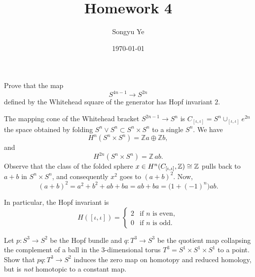 \documentclass[12pt]{article}
\title{Homework 4}
\author{Songyu Ye}
\date{\today}
\begin{document}
\psettitle

\begin{problem}[1]
Prove that the map
\[
S^{4n-1}\to S^{2n}
\]
defined by the Whitehead square of the generator has Hopf invariant \(2\).
\end{problem}

\begin{solution}
    The mapping cone of the Whitehead bracket $S^{2n-1} \to S^n$ is $C_{[\iota,\iota]}=S^n\cup_{[\iota,\iota]} e^{2n}$ the space obtained by folding $S^n \vee S^n \subset S^n \times S^n$ to a single $S^n$. We have
\[
H^n(S^n\times S^n) = \mathbb{Z}a \oplus \mathbb{Z}b,
\]
and
\[
H^{2n}(S^n\times S^n) = \mathbb{Z}\,ab.
\]
Observe that the class of the folded sphere \(x \in H^n(C_{[\iota,\iota]},\mathbb{Z}) \cong \mathbb{Z}\) pulls back to \(a+b\) in \(S^n\times S^n\),
and consequently \(x^2\) goes to \((a+b)^2\). Now,
\[
(a+b)^2 = a^2 + b^2 + ab + ba = ab + ba = \bigl(1 + (-1)^n\bigr)ab.
\]

In particular, the Hopf invariant is
\[
H([\iota,\iota]) =
\begin{cases}
2 & \text{if \(n\) is even},\\
0 & \text{if \(n\) is odd}.
\end{cases}
\]
\end{solution}

\begin{problem}[2 (Hatcher AT, 4.2.34)]
Let \(p:S^3\to S^2\) be the Hopf bundle and \(q:T^3\to S^3\) be the quotient map collapsing the complement of a ball in the \(3\)-dimensional torus \(T^3=S^1\times S^1\times S^1\) to a point. Show that \(pq:T^3\to S^2\) induces the zero map on homotopy and reduced homology, but is \emph{not} homotopic to a constant map.
\end{problem}
\end{document}
